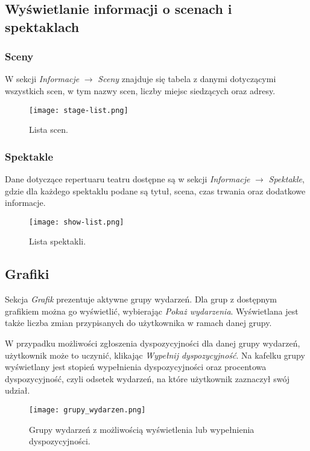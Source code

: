 \documentclass[shortabstract]{iithesis}
\begin{document}
\subsection{Wyświetlanie informacji o scenach i spektaklach}

\subsubsection{Sceny}
\label{stages}
W sekcji \textit{Informacje} $\rightarrow$ \textit{Sceny} znajduje się tabela z danymi dotyczącymi wszystkich scen, w tym nazwy scen, liczby miejsc siedzących oraz adresy.

\begin{figure}[h!]
    \centering
    \texttt{[image: stage-list.png]}
    \caption{Lista scen.}
    \label{fig:stage-list}
\end{figure}

\subsubsection{Spektakle}
Dane dotyczące repertuaru teatru dostępne są w sekcji \textit{Informacje} $\rightarrow$ \textit{Spektakle}, gdzie dla każdego spektaklu podane są tytuł, scena, czas trwania oraz dodatkowe informacje.

\begin{figure}[h!]
    \centering
    \texttt{[image: show-list.png]}
    \caption{Lista spektakli.}
    \label{fig:show-list}
\end{figure}

\newpage

\subsection{Grafiki}

Sekcja \textit{Grafik} prezentuje aktywne grupy wydarzeń. Dla grup z dostępnym grafikiem można go wyświetlić, wybierając \textit{Pokaż wydarzenia}. Wyświetlana jest także liczba zmian przypisanych do użytkownika w ramach danej grupy.

W przypadku możliwości zgłoszenia dyspozycyjności dla danej grupy wydarzeń, użytkownik może to uczynić, klikając \textit{Wypełnij dyspozycyjność}. Na kafelku grupy wyświetlany jest stopień wypełnienia dyspozycyjności oraz procentowa dyspozycyjność, czyli odsetek wydarzeń, na które użytkownik zaznaczył swój udział.

\begin{figure}[h!]
    \centering
    \texttt{[image: grupy\_wydarzen.png]}
    \caption{Grupy wydarzeń z możliwością wyświetlenia lub wypełnienia dyspozycyjności.}
    \label{fig:event-groups}
\end{figure}
\end{document}
